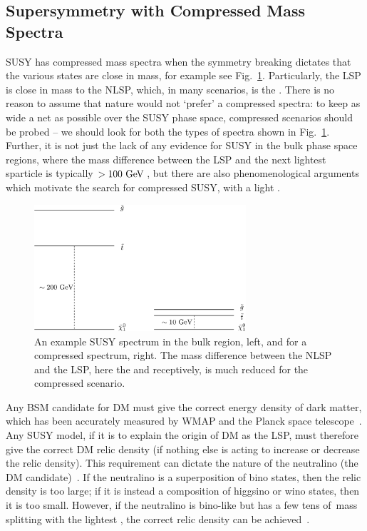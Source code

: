 \subsection{Supersymmetry with Compressed Mass Spectra \label{th:CMPsusy}}

\ac{SUSY} has compressed mass spectra when the symmetry breaking dictates that the various states are close in mass, for example see Fig.~\ref{fig:compSUSYspec}. 
Particularly, the \ac{LSP} is close in mass to the \ac{NLSP}, which, 
in many scenarios, is the \sTop. 
There is no reason to assume that nature would not `prefer' a compressed spectra: to keep as wide a net as possible over the \ac{SUSY} phase space, compressed scenarios should be probed -- we should look for both the types of spectra shown in Fig.~\ref{fig:compSUSYspec}.
Further, it is not just the lack of any evidence for \ac{SUSY} in the bulk phase space regions, 
where the mass difference between the \ac{LSP} and the next lightest sparticle is typically $>100~\mathrm{GeV}\,$, 
but there are also phenomenological arguments which motivate the search for compressed \ac{SUSY}, with a light \sTop.
%
\begin{figure}[t!]
  \begin{center}
  \includegraphics[width=0.7\textwidth]{Figures/theory/susyCompressedSpectra.pdf}
  \caption{An example \ac{SUSY} spectrum in the bulk region, left, and for a compressed spectrum, right. The mass difference between the \ac{NLSP} and the \ac{LSP}, here the \sTop and \chiOneZero receptively, is much reduced for the compressed scenario.}
  \label{fig:compSUSYspec}
  \end{center}
\end{figure}

Any \ac{BSM} candidate for \ac{DM} must give the correct energy density of dark matter, which has been accurately measured by \ac{WMAP} and the Planck space telescope~\cite{WMAP2003,Planck2013}.
Any \ac{SUSY} model, if it is to explain the origin of \ac{DM} as the \ac{LSP}, must therefore give the correct \ac{DM} relic density (if nothing else is acting to increase or decrease the relic density). 
This requirement can dictate the nature of the neutralino (the \ac{DM} candidate)~\cite{CompSUSY1,CompSUSY2}.
If the neutralino is a superposition of bino states, then the relic density is too large; if it is instead a composition of higgsino or wino states, then it is too small.
However, if the neutralino is bino-like but has a few tens of~\GeV mass splitting with the lightest \sTop, the correct relic density can be achieved~\cite{CompSUSY6,CompSUSY9,CompSUSY10}.

